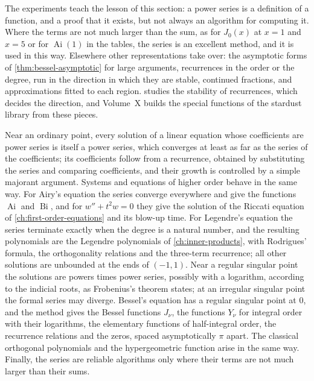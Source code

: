 The experiments teach the lesson of this section: a power series is a definition of a function, and a proof that it exists, but not always an algorithm for computing it. Where the terms are not much larger than the sum, as for $J_0(x)$ at $x=1$ and $x=5$ or for $\operatorname{Ai}(1)$ in the tables, the series is an excellent method, and it is used in this way. Elsewhere other representations take over: the asymptotic forms of \cref{thm:bessel-asymptotic} for large arguments, recurrences in the order or the degree, run in the direction in which they are stable, continued fractions, and approximations fitted to each region.  studies the stability of recurrences, which decides the direction, and Volume~X builds the special functions of the stardust library from these pieces.

\bigskip
Near an ordinary point, every solution of a linear equation whose coefficients are power series is itself a power series, which converges at least as far as the series of the coefficients; its coefficients follow from a recurrence, obtained by substituting the series and comparing coefficients, and their growth is controlled by a simple majorant argument. Systems and equations of higher order behave in the same way. For Airy's equation the series converge everywhere and give the functions $\operatorname{Ai}$ and $\operatorname{Bi}$, and for $w''+t^2w=0$ they give the solution of the Riccati equation of \cref{ch:first-order-equations} and its blow-up time. For Legendre's equation the series terminate exactly when the degree is a natural number, and the resulting polynomials are the Legendre polynomials of \cref{ch:inner-products}, with Rodrigues' formula, the orthogonality relations and the three-term recurrence; all other solutions are unbounded at the ends of $(-1,1)$. Near a regular singular point the solutions are powers times power series, possibly with a logarithm, according to the indicial roots, as Frobenius's theorem states; at an irregular singular point the formal series may diverge. Bessel's equation has a regular singular point at $0$, and the method gives the Bessel functions $J_\nu$, the functions $Y_\nu$ for integral order with their logarithms, the elementary functions of half-integral order, the recurrence relations and the zeros, spaced asymptotically $\pi$ apart. The classical orthogonal polynomials and the hypergeometric function arise in the same way. Finally, the series are reliable algorithms only where their terms are not much larger than their sums.

